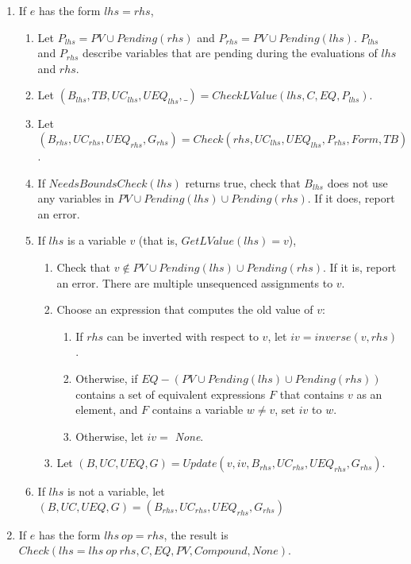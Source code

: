\begin{enumerate}
\item If $e$ has the form $lhs = rhs$,
\label{list:check-assignment}
\begin{enumerate}
\item Let $P_{lhs} = PV \cup Pending(rhs)$ and $P_{rhs} = PV \cup Pending(lhs).$   $P_{lhs}$
        and $P_{rhs}$ describe variables that are pending during the evaluations of $lhs$ and $rhs$.
\item Let $(B_{lhs}, TB, {UC}_{lhs}, {UEQ}_{lhs}, \_) = CheckLValue(lhs, C, EQ, P_{lhs})$.  
\item Let $(B_{rhs},  {UC}_{rhs}, {UEQ}_{rhs}, G_{rhs}) = 
Check(rhs, {UC}_{lhs}, {UEQ}_{lhs},P_{rhs}, Form, TB)$.
\item If $NeedsBoundsCheck(lhs)$ returns true, check that $B_{lhs}$ does not use any variables in 
$PV \cup Pending(lhs) \cup Pending(rhs)$.  If it does, report an error.
\item  If $lhs$ is a variable $v$ (that is, $GetLValue(lhs) = { v }$),
\begin{enumerate}
\item Check that $v \notin PV \cup Pending(lhs) \cup Pending(rhs)$.  If it is, report an error.  
There are multiple unsequenced assignments to $v$.
\item Choose an expression that computes the old value of $v$:
\begin{enumerate}
\item If $rhs$ can be inverted with respect to $v$, let $iv = inverse(v, rhs)$. 
\item Otherwise, if $EQ - (PV \cup Pending(lhs) \cup Pending(rhs))$ contains a set of equivalent expressions $F$ that contains $v$ as 
an element, and $F$ contains a variable $w \neq v$, set $iv$ to $w$.
\item Otherwise, let $iv = $ {\it None}.
\end{enumerate}
\item Let $(B, UC, UEQ, G) = Update(v, iv, B_{rhs}, UC_{rhs}, UEQ_{rhs}, G_{rhs})$.
\end{enumerate}
\item If $lhs$ is not a variable, let $(B, UC, UEQ, G) = (B_{rhs}, UC_{rhs}, UEQ_{rhs}, G_{rhs})$
\end{enumerate}


\item If $e$ has the form $lhs~op= rhs$, the result is 
$Check (lhs = lhs~op~rhs, C, EQ, PV, Compound, None)$.


\end{enumerate}
